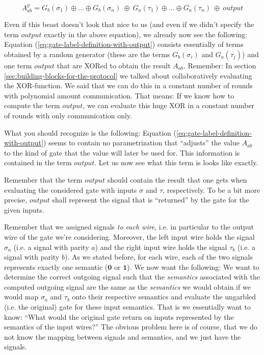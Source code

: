 \begin{equation}
  \label{eq:gate-label-definition-with-output}
  A_{ab}^g = G_b(\sigma_1)\oplus\dots\oplus G_b(\sigma_n) \ \oplus \ G_a(\tau_1)\oplus\dots\oplus G_a(\tau_n) \ \oplus \ output
\end{equation}

Even if this beast doesn't look that nice to us (and even if we didn't specify the term $output$ exactly in the above equation), we already now see the following: Equation (\ref{eq:gate-label-definition-with-output}) consists essentially of terms obtained by a random generator (these are the terms $G_b(\sigma_i)$ and $G_a(\tau_j)$) and one term $output$ that are XORed to obtain the result $A_{ab}$. Remember: In section \ref{sec:building-blocks-for-the-protocol} we talked about collaboratively evaluating the XOR-function. We said that we can do this in a constant number of rounds with polynomial amount communication. That means: If we know how to compute the term $output$, we can evaluate this huge XOR in a constant number of rounds with only communication only.

What you should recognize is the following: Equation (\ref{eq:gate-label-definition-with-output}) seems to contain no parametrization that ``adjusts'' the value $A_{ab}$ to the kind of gate that the value will later be used for. This information is contained in the term $output$. Let us now see what this term is looks like exactly.

Remember that the term $output$ should contain the result that one gets when evaluating the considered gate with inputs $\sigma$ and $\tau$, respectively. To be a bit more precise, $output$ shall represent the signal that is ``returned'' by the gate for the given inputs.

Remember that we assigned signals \emph{to each wire}, i.e. in particular to the output wire of the gate we're considering. Moreover, the left input wire holds the signal $\sigma_a$ (i.e. a signal with parity $a$) and the right input wire holds the signal $\tau_b$ (i.e. a signal with parity $b$). As we stated before, for each wire, each of the two signals represents exactly one semantic ($\mathbf{0}$ or $\mathbf{1}$). We now want the following: We want to determine the correct outgoing signal such that the \emph{semantics} associated with the computed outgoing signal are the same as the \emph{semantics} we would obtain if we would map $\sigma_a$ and $\tau_b$ onto their respective semantics and evaluate the ungarbled (i.e. the original) gate for these input semantics. That is we essentially want to know: ``What would the original gate return on inputs represented by the semantics of the input wires?'' The obvious problem here is of course, that we do not know the mapping between signals and semantics, and we just have the signals.

